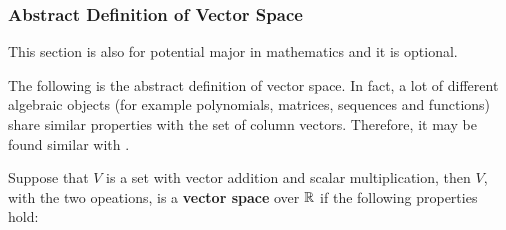 \documentclass[a4paper,12pt]{article}
\begin{document}
\subsubsection{Abstract Definition of Vector Space}
\begin{cmt}
  This section is also for potential major in mathematics and it is optional.
\end{cmt}\n

The following is the abstract definition of vector space. In fact, a lot of different algebraic objects (for example polynomials, matrices, sequences and functions) share similar properties with the set of column vectors. Therefore, it may be found similar with \rpst[\sctr{1}].\n

\begin{pst}
  Suppose that $V$ is a set with vector addition and scalar multiplication, then $V$, with the two opeations, is a \textbf{vector space} over $\mathbb{R}$ if the following properties hold:


\end{pst}
\end{document}
